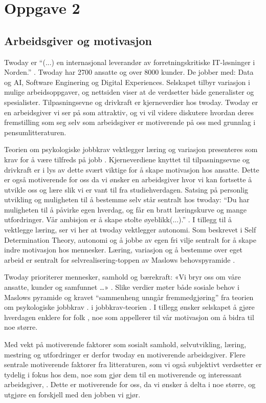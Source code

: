 \section{Oppgave 2}
\subsection{Arbeidsgiver og motivasjon}
Twoday er \enquote{(...) en internasjonal leverandør av forretningskritiske IT-løsninger i Norden.}
\parencite{Twoday.no}. Twoday har 2700 ansatte og over 8000 kunder. De jobber med: Data og AI, Software Enginering
og Digital Experiences. Selskapet tilbyr variasjon i mulige arbeidsoppgaver, og nettsiden viser at de
verdsetter både generalister og spesialister. Tilpasningsevne og drivkraft er kjerneverdier hos twoday. Twoday er
en arbeidsgiver vi ser på som attraktiv, og vi vil videre diskutere hvordan deres fremstilling som seg selv som 
arbeidsgiver er motiverende på oss med grunnlag i pensumlitteraturen. 

Teorien om psykologiske jobbkrav vektlegger læring og variasjon presenteres som krav for å være tilfreds på jobb \parencite[][s.120]{Teknologiledelse}. 
Kjerneverdiene knyttet til tilpasningsevne og drivkraft er i lys av dette svært viktige for å skape motivasjon hos ansatte. Dette er også motiverende for 
oss da vi ønsker en arbeidsgiver hvor vi kan fortsette å utvikle oss og lære slik vi er vant til fra studiehverdagen.
Satsing på personlig utvikling og muligheten til å bestemme selv står sentralt hos twoday: \enquote{Du har muligheten
til å påvirke egen hverdag, og får en bratt læringskurve og mange utfordringer. Vår ambisjon er å
skape stolte øyeblikk(...).} \parencite["Graduateprogrammet"]{Twoday.no}. I tillegg til å vektlegge læring, ser
vi her at twoday vektlegger autonomi. Som beskrevet i Self Determination Theory\parencite[][s.121]{Teknologiledelse},
autonomi og å jobbe av egen fri vilje sentralt for å skape indre motivasjon hos mennesker. Læring,
variasjon og å bestemme over eget arbeid er sentralt for selvrealisering-toppen av Maslows
behovspyramide \parencite[][s.116]{Teknologiledelse}.

Twoday prioriterer mennesker, samhold og bærekraft:  
«Vi bryr oss om våre ansatte, kunder og samfunnet …» \parencite["Om oss"]{Twoday.no}.  
Slike verdier møter både sosiale behov i Maslows pyramide og kravet “sammenheng unngår
fremmedgjøring” fra teorien om psykologiske jobbkrav \parencite[][s.120]{Teknologiledelse}. i jobbkrav-teorien \parencite[][s. 120]{Teknologiledelse}.  
I tillegg ønsker selskapet å gjøre hverdagen enklere for folk \parencite["Graduateprogrammet"]{Twoday.no}, noe som appellerer til vår motivasjon om å bidra til noe større.  


Med vekt på motiverende faktorer som sosialt samhold, selvutvikling, læring, mestring og utfordringer er derfor
twoday en motiverende arbeidsgiver. Flere sentrale motiverende faktorer fra litteraturen, som vi også subjektivt verdsetter
er tydelig i fokus hos dem, noe som gjør dem til en motiverende og interessant arbeidsgiver, \parencite["Graduateprogrammet"]{Twoday.no}. Dette er motiverende for oss, da vi ønsker å delta i noe
større, og utgjøre en forskjell med den jobben vi gjør.

